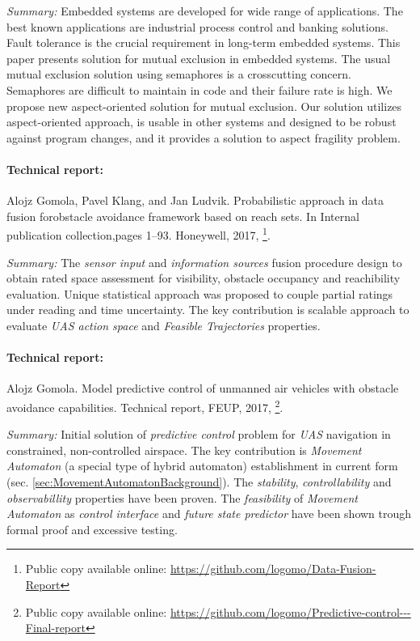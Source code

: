 \emph{Summary:} Embedded systems are developed for wide range of applications. The best known applications are industrial process control and banking solutions. Fault tolerance is the crucial requirement in long-term embedded systems. This paper presents solution for mutual exclusion in embedded systems. The usual mutual exclusion solution using semaphores is a crosscutting concern. Semaphores are difficult to maintain in code and their failure rate is high. We propose new aspect-oriented solution for mutual exclusion. Our solution utilizes aspect-oriented approach, is usable in other systems and designed to be robust against program changes, and it provides a solution to aspect fragility problem.

\paragraph{Technical report:} Alojz Gomola, Pavel Klang, and Jan Ludvik. Probabilistic approach in data fusion forobstacle avoidance framework based on reach sets. In Internal publication collection,pages 1–93. Honeywell, 2017, \cite{gomola2017probabilistic}\footnote{Public copy available online: \url{https://github.com/logomo/Data-Fusion-Report}}.

\emph{Summary:} The \emph{sensor input} and \emph{information sources} fusion procedure design to obtain rated space assessment for visibility, obstacle occupancy and reachibility evaluation. Unique statistical approach was proposed to couple partial ratings under reading and time uncertainty. The key contribution is scalable approach to evaluate \emph{UAS action space} and \emph{Feasible Trajectories} properties. 

\paragraph{Technical report:}  Alojz Gomola. Model predictive control of unmanned air vehicles with obstacle avoidance capabilities.  Technical report, FEUP, 2017, \cite{gomola2017mpc}\footnote{Public copy available online: \url{https://github.com/logomo/Predictive-control---Final-report}}.

\emph{Summary:} Initial solution of \emph{predictive control} problem for \emph{UAS} navigation in constrained, non-controlled airspace. The key contribution is \emph{Movement Automaton} (a special type of hybrid automaton) establishment in current form (sec. \ref{sec:MovementAutomatonBackground}). The \emph{stability}, \emph{controllability} and \emph{observabillity} properties have been proven. The \emph{feasibility} of \emph{Movement Automaton} as \emph{control interface} and \emph{future state predictor} have been shown trough formal proof and excessive testing.

